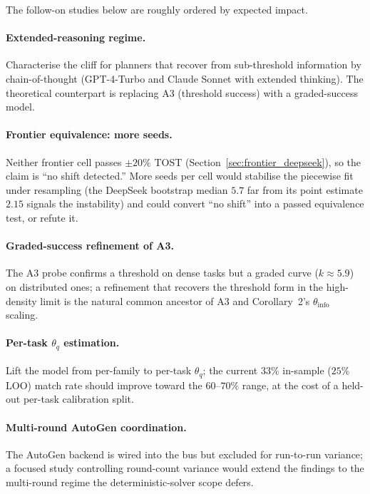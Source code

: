 The follow-on studies below are roughly ordered by expected impact.

\paragraph{Extended-reasoning regime.}
Characterise the cliff for planners that recover from sub-threshold
information by chain-of-thought (GPT-4-Turbo and Claude
Sonnet with extended thinking). The theoretical counterpart is
replacing A3 (threshold success) with a graded-success model.

\paragraph{Frontier equivalence: more seeds.}
Neither frontier cell passes $\pm20\%$ TOST
(Section~\ref{sec:frontier_deepseek}), so the claim is ``no shift
detected.'' More seeds per cell would stabilise the piecewise fit
under resampling (the DeepSeek bootstrap median $5.7$ far from its
point estimate $2.15$ signals the instability) and could convert
``no shift'' into a passed equivalence test, or refute it.

\paragraph{Graded-success refinement of A3.}
The A3 probe confirms a threshold on dense tasks but a graded curve
($k\approx5.9$) on distributed ones; a refinement that recovers the
threshold form in the high-density limit is the natural common
ancestor of A3 and Corollary~2's $\theta_\text{info}$ scaling.

\paragraph{Per-task $\theta_q$ estimation.}
Lift the model from per-family to per-task $\theta_q$; the current
$33\%$ in-sample ($25\%$ LOO) match rate should improve toward the
$60$--$70\%$ range, at the cost of a held-out per-task calibration
split.

\paragraph{Multi-round AutoGen coordination.}
The AutoGen backend is wired into the bus but excluded for run-to-run
variance; a focused study controlling round-count variance would
extend the findings to the multi-round regime the
deterministic-solver scope defers.

